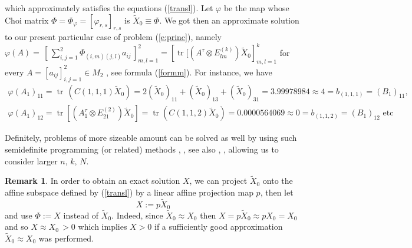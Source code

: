 \documentclass[12pt]{amsart}
\theoremstyle{definition}
\newtheorem{remark}[theorem]{Remark}
\begin{document}
which approximately satisfies the equations (\ref{transl}). 
Let $\varphi$ be the map whose Choi matrix $\Phi =\Phi_\varphi =[\varphi_{r,s}]_{r,s}$ is $\widetilde{X}_0 \equiv \Phi$. We got then
an approximate solution to our present particular case of problem (\ref{e:princ}), namely $
\varphi (A)=\,\left [\, \sum_{i,j=1}^2 \Phi_{(i,m)(j,l)}a_{ij}\, \right]_{m,l=1}^2 =\left[ {\operatorname{tr}} [(A^\tau \otimes E^{(k)}_{lm})\widetilde{X}_0 \right]_{m,l=1}^k  
$
for every $A=[a_{ij}]_{i,j=1}^2 \in M_2 $ , see formula (\ref{formm}). 
For instance, we have   \begin{multline}\varphi (A_1 )_{11}=\!  {\operatorname{tr}}\, (C(1,1,1)\widetilde{X}_{0})=2(\widetilde{X}_0 )_{11}+(\widetilde{X}_0 )_{13}+(\widetilde{X}_0 )_{31} =3.99978984  
\approx 4 =b_{(1,1,1)}=(B_{1})_{11} \mbox{,}\nonumber 
\\
\varphi (A_1 )_{12}={\operatorname{tr}} \left[ (A_{1}^\tau \otimes E_{21}^{(2)})\widetilde{X}_0 \right] ={\operatorname{tr}} (C(1,1,2)\widetilde{X}_0 )=0.0000564069 \approx 0=b_{(1,1,2)}=(B_1 )_{12}
\mbox{ etc}\nonumber\end{multline}

Definitely, problems of more sizeable amount can be solved as well by using such  semidefinite programming (or related) 
methods \cite{NesterovNemirovsky}, \cite{VanderbergheBoyd}, see also \cite{borch} ,  \cite{KocvaraStingl}, allowing us to consider  larger $n,\, k,\, N$.

\begin{remark}{\rm In order to obtain an exact solution $X$, we can
project  $\widetilde{X}_0 $  onto the affine subspace defined by (\ref{transl}) by  a linear affine projection map $p$, then let
$$
X:=p\widetilde{X}_0   
$$ and use $\Phi :=X$ instead of $\widetilde{X}_0 $. Indeed, since $\widetilde{X}_0 \approx X_0$ then $X=p\widetilde{X}_0 \approx pX_0 =X_0 $ and so $X\approx  X_0 \,  >0$ which implies   $X>0$ if a sufficiently good approximation $\widetilde{X}_0 \approx X_0$ 
 was performed.}
\end{remark}
\end{document}
